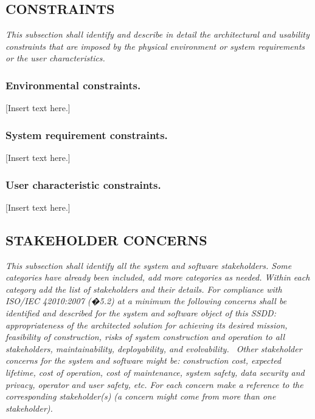 \documentclass[twoside,letterpaper]{article}
\begin{document}
\subsection{CONSTRAINTS}
{\itshape\color{black}
This subsection shall identify and describe in detail the architectural
and usability constraints that are imposed by the physical environment
or system requirements or the user characteristics.}

\subsubsection{Environmental constraints.}
{\color{black}
[Insert text here.] }

\subsubsection{System requirement constraints.}
{\color{black}
[Insert text here.]}

\subsubsection{User characteristic constraints.}
{\color{black}
[Insert text here.]}

\subsection[STAKEHOLDER
CONCERNS]{\bfseries\color{black} STAKEHOLDER
CONCERNS}
{\itshape\color{black}
This subsection shall identify all the system and software stakeholders.
Some categories have already been included, add more categories as
needed. Within each category add the list of stakeholders and their
details. For compliance with ISO/IEC 42010:2007 (�5.2) at a minimum the
following concerns shall be identified and described for the system and
software object of this SSDD: appropriateness of the architected
solution for achieving its desired mission, feasibility of
construction, risks of system construction and operation to all
stakeholders, maintainability, deployability, and evolvability. \ Other
stakeholder concerns for the system and software might be: construction
cost, expected lifetime, cost of operation, cost of maintenance, system
safety, data security and privacy, operator and user safety, etc. For
each concern make a reference to the corresponding stakeholder(s) (a
concern might come from more than one stakeholder).}
\end{document}
